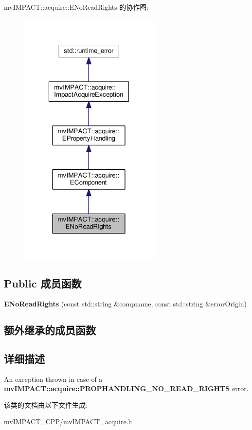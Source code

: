 mv\+I\+M\+P\+A\+C\+T\+:\+:acquire\+:\+:E\+No\+Read\+Rights 的协作图\+:
\nopagebreak
\begin{figure}[H]
\begin{center}
\leavevmode
\includegraphics[width=202pt]{classmv_i_m_p_a_c_t_1_1acquire_1_1_e_no_read_rights__coll__graph}
\end{center}
\end{figure}
\subsection*{Public 成员函数}
\begin{DoxyCompactItemize}
\item 
\hypertarget{classmv_i_m_p_a_c_t_1_1acquire_1_1_e_no_read_rights_ae474bd01f65ada5d58099442d3a8a1e3}{{\bfseries E\+No\+Read\+Rights} (const std\+::string \&compname, const std\+::string \&error\+Origin)}\label{classmv_i_m_p_a_c_t_1_1acquire_1_1_e_no_read_rights_ae474bd01f65ada5d58099442d3a8a1e3}

\end{DoxyCompactItemize}
\subsection*{额外继承的成员函数}


\subsection{详细描述}
An exception thrown in case of a {\bfseries mv\+I\+M\+P\+A\+C\+T\+::acquire\+::\+P\+R\+O\+P\+H\+A\+N\+D\+L\+I\+N\+G\+\_\+\+N\+O\+\_\+\+R\+E\+A\+D\+\_\+\+R\+I\+G\+H\+T\+S} error. 

该类的文档由以下文件生成\+:\begin{DoxyCompactItemize}
\item 
mv\+I\+M\+P\+A\+C\+T\+\_\+\+C\+P\+P/mv\+I\+M\+P\+A\+C\+T\+\_\+acquire.\+h\end{DoxyCompactItemize}
